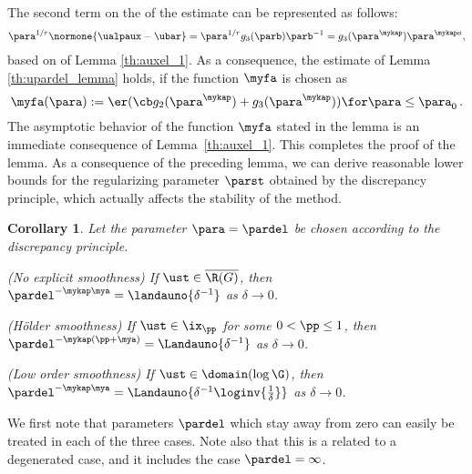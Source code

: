 \documentclass[10pt]{article}
\newtheorem{corollary}[theorem]{Corollary}
\theoremstyle{definition}
\begin{document}
The second term on the \rhs of the estimate 
can be represented as follows:
%
\begin{align*}
\para^{1/r} \normone{\ualpaux-\ubar}
=
\para^{1/r} g_3(\parb)\parb^{-1}
= g_3(\para^{\mykap})\para^{\mykap a},
\end{align*}
%
based on  of Lemma \ref{th:auxel_1}.
%
As a consequence, the estimate of Lemma \ref{th:upardel_lemma} holds, if the
function $ \myfa $ is chosen as
$$ \myfa(\para):=  \er(\cb g_2(\para^\mykap)+g_3(\para^\mykap)) \for \para \le \para_0 \,. $$
%
The asymptotic behavior of the function $ \myfa $ stated in the lemma is an immediate consequence of
Lemma~\ref{th:auxel_1}.
This completes the proof of the lemma.
\proofend
%
As a consequence of the preceding lemma, we can derive reasonable lower bounds for the regularizing parameter $ \parst $ obtained by the discrepancy principle, which actually affects the stability
of the method.
\begin{corollary}
\label{th:upardel_cor}
\mainassump Let the parameter $ \para = \pardel $ be chosen according to the discrepancy principle.
%
\begin{mylist_indent}
\item (No explicit smoothness)
If $ \ust \in \overline{\R(G)} $, then
$ \pardel^{-\mykap \mya} = \landauno{\delta^{-1}} $ as $ \delta \to 0 $.
%
\item (H\"older smoothness)
If $ \ust \in \ix_\pp $ for some $ 0 < \pp \le 1 $, then
$ \pardel^{-\mykap(\pp + \mya)} = \Landauno{\delta^{-1}} $ as $ \delta \to 0 $.
%
\item (Low order smoothness)
If $ \ust \in \domain(\log \G) $, then
$ \pardel^{-\mykap\mya} = \Landauno{\delta^{-1}\loginv{\tfrac{1}{\delta}}} $ as $ \delta \to 0 $.
\end{mylist_indent}
\end{corollary}
%
\proof
We first note that parameters $ \pardel $ which stay away from zero
can easily be treated in each of the three cases.
Note also that this is a related to a degenerated case, and it includes the case $ \pardel = \infty $.
\end{document}
